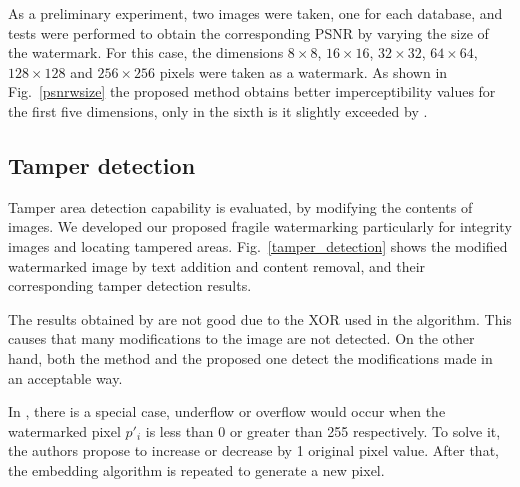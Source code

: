 \documentclass[runningheads]{llncs}
\begin{document}
As a preliminary experiment, two images were taken, one for each database, and tests were performed to obtain the corresponding PSNR by varying the size of the watermark. For this case, the dimensions $8\times 8$, $16\times 16$, $32\times 32$, $64\times 64$, $128\times 128$ and $256\times 256$ pixels were taken as a watermark. As shown in Fig.~\ref{psnrwsize} the proposed method obtains better imperceptibility values for the first five dimensions, only in the sixth is it slightly exceeded by \cite{shivani2017dual}.

\subsection{Tamper detection}
Tamper area detection capability is evaluated, by modifying the contents of images. We developed our proposed fragile watermarking particularly for integrity images and locating tampered areas. Fig.~\ref{tamper_detection} shows the modified watermarked image by text addition and content removal, and their corresponding tamper detection results.

The results obtained by \cite{shivani2017dual} are not good due to the XOR used in the algorithm. This causes that many modifications to the image are not detected. On the other hand, both the \cite{liu2018blind} method and the proposed one detect the modifications made in an acceptable way.

In \cite{liu2018blind}, there is a special case, underflow or overflow would occur when the watermarked pixel $p'_i$ is less than 0 or greater than 255 respectively. To solve it, the authors propose to increase or decrease by 1 original pixel value. After that, the embedding algorithm is repeated to generate a new pixel.
\end{document}
